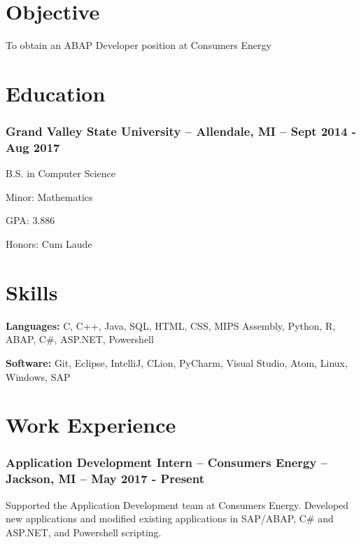 \documentclass{article}
\begin{document}
	\hfill				%

	\section*{Objective}
	\begin{addmargin}[1em]{0em}
		To obtain an ABAP Developer position at Consumers Energy
	\end{addmargin}

	\section*{Education}

		\subsubsection{Grand Valley State University -- Allendale, MI -- Sept 2014 - Aug 2017}
			\begin{addmargin}[1em]{0em}

				B.S. in Computer Science

				Minor: Mathematics

				GPA: 3.886

				Honors: Cum Laude


			\end{addmargin}

	\section*{Skills}
	\begin{addmargin}[1em]{0em}
		\textbf{Languages:} C, C++, Java, SQL, HTML, CSS, MIPS Assembly, Python, R, ABAP, C\#, ASP.NET, Powershell

		\textbf{Software:} Git, Eclipse, IntelliJ, CLion, PyCharm, Visual Studio, Atom, Linux, Windows, SAP
	\end{addmargin}

	\section*{Work Experience}

		\subsubsection{Application Development Intern -- Consumers Energy -- Jackson, MI -- May 2017 - Present}
			\begin{addmargin}[1em]{0em}
				Supported the Application Development team at Consumers Energy. Developed new applications and modified existing applications in SAP/ABAP, C\# and ASP.NET, and Powershell scripting.
			\end{addmargin}
\end{document}

